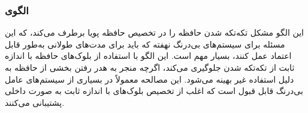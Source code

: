 \subsubsection{الگوی }
\label{memFixSizeBufSec}
\begin{RTL}
این الگو \cite{ref4}
مشکل تکه‌تکه شدن حافظه را در تخصیص حافظه پویا برطرف می‌کند،
که این مسئله برای سیستم‌های بی‌درنگ نهفته که باید برای مدت‌های طولانی
به‌طور قابل اعتماد عمل کنند، بسیار مهم است.
این الگو با استفاده از بلوک‌های حافظه با اندازه ثابت از تکه‌تکه شدن
جلوگیری می‌کند، اگرچه منجر به هدر رفتن بخشی از حافظه به دلیل
استفاده غیر بهینه می‌شود. این مصالحه معمولاً در بسیاری از
سیستم‌های عامل بی‌درنگ قابل قبول است که اغلب از
تخصیص بلوک‌های با اندازه ثابت به صورت داخلی پشتیبانی می‌کنند.
\end{RTL}